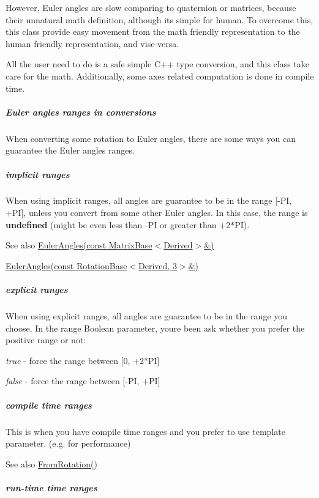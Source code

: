 However, Euler angles are slow comparing to quaternion or matrices, because their unnatural math definition, although it\textquotesingle{}s simple for human. To overcome this, this class provide easy movement from the math friendly representation to the human friendly representation, and vise-\/versa.

All the user need to do is a safe simple C++ type conversion, and this class take care for the math. Additionally, some axes related computation is done in compile time.

\subparagraph*{Euler angles ranges in conversions}

When converting some rotation to Euler angles, there are some ways you can guarantee the Euler angles ranges.

\subparagraph*{implicit ranges}

When using implicit ranges, all angles are guarantee to be in the range \mbox{[}-\/\+PI, +\+PI\mbox{]}, unless you convert from some other Euler angles. In this case, the range is {\bfseries undefined} (might be even less than -\/\+PI or greater than +2$\ast$\+PI). \begin{DoxySeeAlso}{See also}
\hyperlink{class_eigen_1_1_euler_angles_ae2f34ff915892795d3d304c5dd0eec42}{Euler\+Angles(const Matrix\+Base$<$\+Derived$>$\&)} 

\hyperlink{class_eigen_1_1_euler_angles_a22539c574d7b6ca4577691f533f60061}{Euler\+Angles(const Rotation\+Base$<$\+Derived, 3$>$\&)}
\end{DoxySeeAlso}
\subparagraph*{explicit ranges}

When using explicit ranges, all angles are guarantee to be in the range you choose. In the range Boolean parameter, you\textquotesingle{}re been ask whether you prefer the positive range or not\+:
\begin{DoxyItemize}
\item {\itshape true} -\/ force the range between \mbox{[}0, +2$\ast$\+PI\mbox{]}
\item {\itshape false} -\/ force the range between \mbox{[}-\/\+PI, +\+PI\mbox{]}
\end{DoxyItemize}

\subparagraph*{compile time ranges}

This is when you have compile time ranges and you prefer to use template parameter. (e.\+g. for performance) \begin{DoxySeeAlso}{See also}
\hyperlink{class_eigen_1_1_euler_angles_accbaa67f736f1883641f70994ffc7284}{From\+Rotation()}
\end{DoxySeeAlso}
\subparagraph*{run-\/time time ranges}

